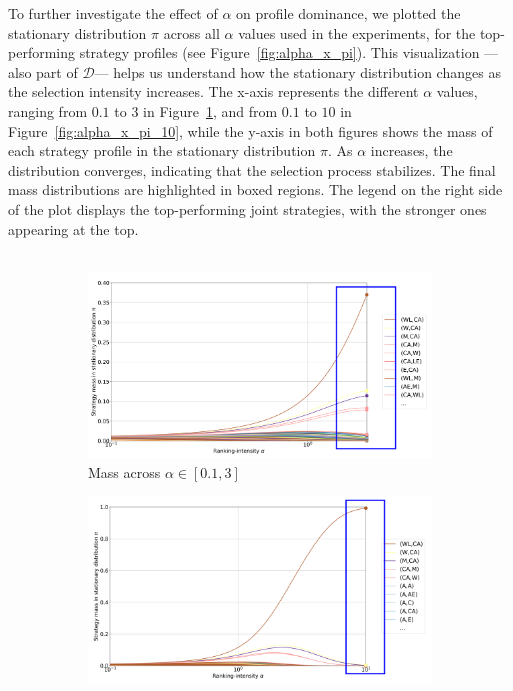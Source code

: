 \begin{flushleft}
\begin{flushleft}
        To further investigate the effect of $\alpha$ on profile dominance, we plotted the stationary distribution $\pi$ across all $\alpha$ values used in the experiments, for the top-performing strategy profiles (see Figure~\ref{fig:alpha_x_pi}). This visualization —also part of $\mathcal{D}$— helps us understand how the stationary distribution changes as the selection intensity increases. The x-axis represents the different $\alpha$ values, ranging from $0.1$ to $3$ in Figure~\ref{fig:alpha_x_pi_3}, and from $0.1$ to $10$ in Figure~\ref{fig:alpha_x_pi_10}, while the y-axis in both figures shows the mass of each strategy profile in the stationary distribution $\pi$. As $\alpha$ increases, the distribution converges, indicating that the selection process stabilizes. The final mass distributions are highlighted in boxed regions. The legend on the right side of the plot displays the top-performing joint strategies, with the stronger ones appearing at the top.\\~\\
        \begin{figure}[H]
            \centering
            \begin{subfigure}[b]{0.49\linewidth}
                \includegraphics[width=\linewidth]{images/alpha_x_pi_3.png}
                \caption{Mass across $\alpha \in [0.1, 3]$}
                \label{fig:alpha_x_pi_3}
            \end{subfigure}
            \hfill
            \begin{subfigure}[b]{0.49\linewidth}
                \includegraphics[width=\linewidth]{images/alpha_x_pi_10.png}

\end{subfigure}
\end{figure}
\end{flushleft}
\end{flushleft}
